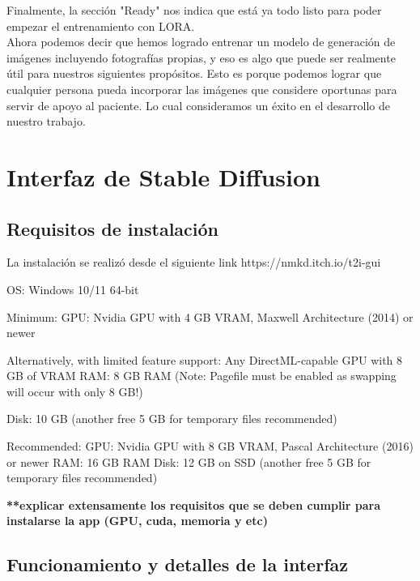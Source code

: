 Finalmente, la sección "Ready" nos indica que está ya todo listo para poder empezar el entrenamiento con LORA. \\

Ahora podemos decir que hemos logrado entrenar un modelo de generación de imágenes incluyendo fotografías propias, y eso es algo que puede ser realmente útil para nuestros siguientes propósitos. Esto es porque podemos lograr que cualquier persona pueda incorporar las imágenes que considere oportunas para servir de apoyo al paciente. Lo cual consideramos un éxito en el desarrollo de nuestro trabajo. 


\section{Interfaz de Stable Diffusion}

\subsection{Requisitos de instalación}

La instalación se realizó desde el siguiente link 
https://nmkd.itch.io/t2i-gui

OS: Windows 10/11 64-bit

Minimum:
GPU: Nvidia GPU with 4 GB VRAM, Maxwell Architecture (2014) or newer

Alternatively, with limited feature support: Any DirectML-capable GPU with 8 GB of VRAM
RAM: 8 GB RAM (Note: Pagefile must be enabled as swapping will occur with only 8 GB!)

Disk: 10 GB (another free 5 GB for temporary files recommended)

Recommended:
GPU: Nvidia GPU with 8 GB VRAM, Pascal Architecture (2016) or newer
RAM: 16 GB RAM
Disk: 12 GB on SSD (another free 5 GB for temporary files recommended)

\textbf{**explicar extensamente los requisitos que se deben cumplir para instalarse la app (GPU, cuda, memoria y etc)}

\subsection{Funcionamiento y detalles de la interfaz}

